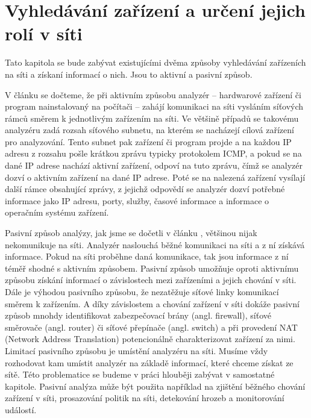 \documentclass[thesis=B,czech,hidelinks]{FITthesis}[2019/03/21]
\begin{document}
\chapter{Vyhledávání zařízení a určení jejich rolí v síti}
    Tato kapitola se bude zabývat existujícími dvěma způsoby vyhledávání zařízeních na síti a získaní informací o nich. Jsou to aktivní a pasivní způsob.
    
    V článku \cite{Passive} se dočteme, že při aktivním způsobu analyzér -- hardwarové zařízení či program nainstalovaný na počítači -- zahájí komunikaci na síti vysláním síťových rámců směrem k jednotlivým zařízením na síti. Ve většině případů se takovému analyzéru zadá rozsah síťového subnetu, na kterém se nacházejí cílová zařízení pro analyzování. Tento subnet pak zařízení či program projde a na každou IP adresu z rozsahu pošle krátkou zprávu typicky protokolem ICMP, a pokud se na dané IP adrese nachází aktivní zařízení, odpoví na tuto zprávu, čímž se analyzér dozví o aktivním zařízení na dané IP adrese. Poté se na nalezená zařízení vysílají další rámce obsahující zprávy, z jejichž odpovědí se analyzér dozví potřebné informace jako IP adresu, porty, služby, časové informace a informace o operačním systému zařízení. 
    
    Pasivní způsob analýzy, jak jsme se dočetli v článku \cite{Passive}, většinou nijak nekomunikuje na síti. Analyzér naslouchá běžné komunikaci na síti a z ní získává informace. Pokud na síti proběhne daná komunikace, tak jsou informace z ní téměř shodné s aktivním způsobem. Pasivní způsob umožňuje oproti aktivnímu způsobu získání informací o závislostech mezi zařízeními a jejich chování v síti. Dále je výhodou pasivního způsobu, že nezatěžuje síťové linky komunikací směrem k zařízením. A díky závislostem a chování zařízení v síti dokáže pasivní způsob mnohdy identifikovat zabezpečovací brány (angl. firewall), síťové směrovače (angl. router) či síťové přepínače (angl. switch) a při provedení NAT (Network Address Translation) potencionálně charakterizovat zařízení za nimi. Limitací pasivního způsobu je umístění analyzéru na síti. Musíme vždy rozhodovat kam umístit analyzér na základě informací, které chceme získat ze sítě. Této problematice se budeme v práci hlouběji zabývat v samostatné kapitole. Pasivní analýza může být použita například na zjištění běžného chování zařízení v síti, prosazování politik na síti, detekování hrozeb a monitorování událostí. 
    
\end{document}
